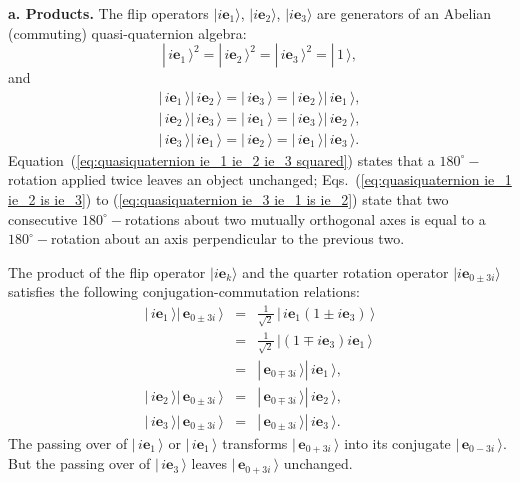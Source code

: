 \documentclass[11pt,twocolumn]{article}
\begin{document}
\textbf{a.  Products.}  The flip operators $|i\mathbf e_1\rangle$, $|i\mathbf e_2\rangle$, $|i\mathbf e_3\rangle$ are generators of an Abelian (commuting) quasi-quaternion algebra:
\begin{equation}
\label{eq:quasiquaternion ie_1 ie_2 ie_3 squared}
|\,i\mathbf e_1\,\rangle^2=|\,i\mathbf e_2\,\rangle^2=|\,i\mathbf e_3\,\rangle^2=|\,1\,\rangle,
\end{equation}
and
\begin{eqnarray}
\label{eq:quasiquaternion ie_1 ie_2 is ie_3}
|\,i\mathbf e_1\,\rangle|\,i\mathbf e_2\,\rangle=|\,i\mathbf e_3\,\rangle=|\,i\mathbf e_2\,\rangle|\,i\mathbf e_1\,\rangle,\\
\label{eq:quasiquaternion ie_2 ie_3 is ie_1}
|\,i\mathbf e_2\,\rangle|\,i\mathbf e_3\,\rangle=|\,i\mathbf e_1\,\rangle=|\,i\mathbf e_3\,\rangle|\,i\mathbf e_2\,\rangle,\\
\label{eq:quasiquaternion ie_3 ie_1 is ie_2}
|\,i\mathbf e_3\,\rangle|\,i\mathbf e_1\,\rangle=|\,i\mathbf e_2\,\rangle=|\,i\mathbf e_1\,\rangle|\,i\mathbf e_3\,\rangle.
\end{eqnarray}
Equation~(\ref{eq:quasiquaternion ie_1 ie_2 ie_3 squared}) states that a $180^\circ-$rotation applied twice leaves an object unchanged; Eqs.~(\ref{eq:quasiquaternion ie_1 ie_2 is ie_3}) to (\ref{eq:quasiquaternion ie_3 ie_1 is ie_2}) state that two consecutive $180^\circ\!-$rotations about two mutually orthogonal axes is equal to a $180^\circ\!-$rotation about an axis perpendicular to the previous two.

The product of the flip operator $|i\mathbf e_k\rangle$ and the quarter rotation operator $|i\mathbf e_{0\pm 3i}\rangle$ satisfies the following conjugation-commutation relations:
\begin{eqnarray}
\label{eq:conjugation relation ie_1 and e_0+3i}
|\,i\mathbf e_1\,\rangle |\,\mathbf e_{0\pm 3i}\,\rangle
&=&\frac{1}{\sqrt{2}}\, |\,i\mathbf e_1(1\pm i\mathbf e_3)\,\rangle \nonumber\\
&=&\frac{1}{\sqrt{2}}\, |(1\mp i\mathbf e_3)i\mathbf e_1\,\rangle  \nonumber\\
&=&|\,\mathbf e_{0\mp 3i}\,\rangle |\,i\mathbf e_1\,\rangle,\\
\label{eq:conjugation relation ie_2 and e_0+3i}
|\,i\mathbf e_2\,\rangle |\,\mathbf e_{0\pm 3i}\,\rangle
&=&|\,\mathbf e_{0\mp 3i}\,\rangle |\,i\mathbf e_2\,\rangle,\\
\label{eq:conjugation relation ie_3 and e_0+3i}
|\,i\mathbf e_3\,\rangle |\,\mathbf e_{0\pm 3i}\,\rangle
&=&|\,\mathbf e_{0\pm 3i}\,\rangle |\,i\mathbf e_3\,\rangle.
\end{eqnarray}
The passing over of $|\,i\mathbf e_1\,\rangle$ or $|\,i\mathbf e_1\,\rangle$ transforms $|\,\mathbf e_{0+3i}\,\rangle$ into its conjugate $|\,\mathbf e_{0-3i}\,\rangle$.  But the passing over of $|\,i\mathbf e_3\,\rangle$ leaves $|\,\mathbf e_{0+3i}\,\rangle$ unchanged.  
\end{document}
